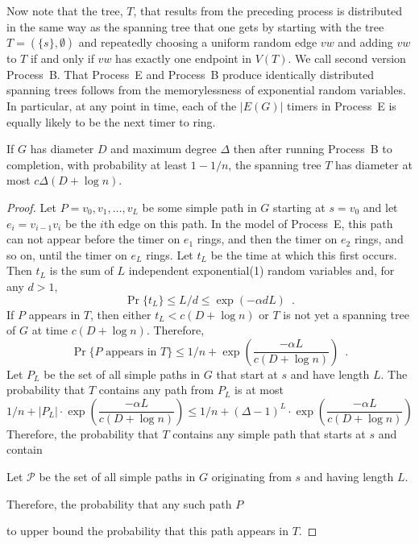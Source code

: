 \documentclass{patmorin}
\begin{document}
Now note that the tree, $T$, that results from the preceding process
is distributed in the same way as the spanning tree that one gets by
starting with the tree $T=(\{s\},\emptyset)$ and repeatedly choosing
a uniform random edge $vw$ and adding $vw$ to $T$ if and only if $vw$
has exactly one endpoint in $V(T)$.  We call second version Process~B.
That Process~E and Process~B produce identically distributed spanning
trees follows from the memorylessness of exponential random variables.
In particular, at any point in time, each of the $|E(G)|$ timers in
Process~E is equally likely to be the next timer to ring.

\begin{lem}
  If $G$ has diameter $D$ and maximum degree $\Delta$ then after running
  Process~B to completion, with probability at least $1-1/n$, the spanning
  tree $T$ has diameter at most $c\Delta(D+\log n)$.
\end{lem}

\begin{proof}
  Let $P=v_0,v_1,\ldots,v_L$ be some simple path in $G$ starting at
  $s=v_0$ and let $e_i=v_{i-1}v_i$ be the $i$th edge on this path.
  In the model of Process~E, this path can not appear before the
  timer on $e_1$ rings, and then the timer on $e_2$ rings, and so on,
  until the timer on $e_L$ rings.  Let $t_L$ be the time at which this
  first occurs.  Then $t_L$ is the sum of $L$ independent exponential(1)
  random variables and, for any $d > 1$,
  \[
      \Pr\{t_L\} \le L/d \le \exp(-\alpha d L) \enspace .
  \]
  If $P$ appears in $T$, then either $t_L < c(D+\log n)$ or $T$ is not
  yet a spanning tree of $G$ at time $c(D+\log n)$.  
  Therefore, 
  \[
      \Pr\{\text{$P$ appears in $T$}\} \le 1/n 
        + \exp\left(\frac{-\alpha L}{c(D+\log n)}\right) \enspace .
  \]
  Let $P_L$ be the set of all simple paths in $G$ that start at $s$ and have length $L$.  The probability that $T$ contains any path from $P_L$ is at most
  \[
      1/n + |P_L|\cdot\exp\left(\frac{-\alpha L}{c(D+\log n)}\right) \le 1/n + (\Delta-1)^L\cdot\exp\left(\frac{-\alpha L}{c(D+\log n)}\right)
  \]
  Therefore, the probability that $T$ contains any simple path that
  starts at $s$ and contain 


Let $\mathcal{P}$ be
  the set of all simple paths in $G$ originating from $s$ and having length $L$.


Therefore, the probability
  that any such path $P$


  to upper bound the probability that this path appears in $T$.  
\end{proof}
\end{document}
